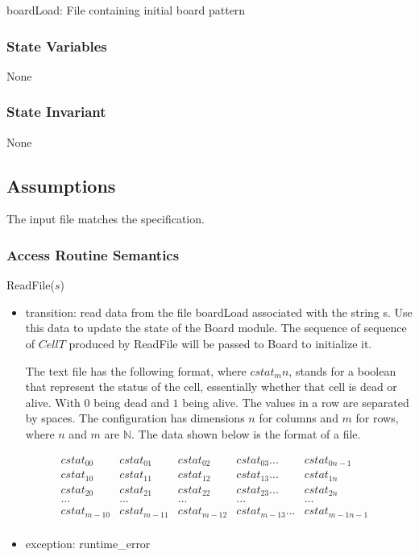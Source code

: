 \documentclass[12pt]{article}
\begin{document}
boardLoad: File containing initial board pattern\\


\subsubsection* {State Variables}

None

\subsubsection* {State Invariant}

None

\subsection* {Assumptions}
The input file matches the specification.

\subsubsection* {Access Routine Semantics}

\noindent ReadFile($s$)
\begin{itemize}
	\item transition: read data from the file boardLoad associated with the string s.
	Use this data to update the state of the Board module.  The sequence of sequence of $CellT$ produced by ReadFile will be passed to Board to initialize it.
	
	The text file has the following format, where $cstat_mn$, stands for a boolean that represent the status of the cell, essentially whether that cell is dead or alive. With $0$ being dead and $1$ being alive. The values in a row are separated by spaces. The configuration has dimensions $n$ for columns and $m$ for rows, where $n$ and $m$ are $\mathbb{N}$. The data shown below is the format of a file.

	\begin{equation}
	\begin{array}{ccccccc}
	cstat_{00} & cstat_{01} & cstat_{02} & cstat_{03} ... & cstat_{0n-1} \\
	cstat_{10} & cstat_{11} & cstat_{12} & cstat_{13} ... & cstat_{1n} \\
	cstat_{20} & cstat_{21} & cstat_{22} & cstat_{23} ... & cstat_{2n} \\
	... & ... & ... & ... & ... & \\
	cstat_{m-10} & cstat_{m-11} & cstat_{m-12} & cstat_{m-13} ... & cstat_{m-1n-1}\\
	\end{array}
	\end{equation}
	
	\item exception: runtime\_error
\end{itemize}
\newpage
\end{document}
